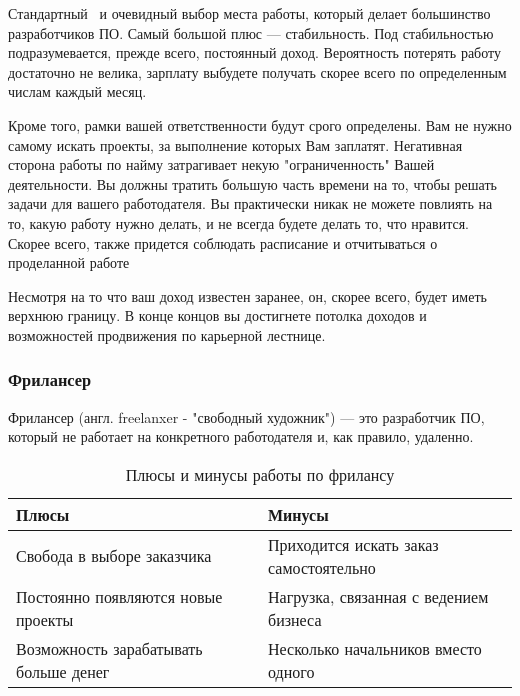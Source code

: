\documentclass{../industrial-development}
\begin{document}
\lecturenotes

Стандартный~\cite[с.~62--67]{Sonmez} и очевидный выбор места работы, который делает большинство разработчиков ПО. 
Самый большой плюс — стабильность. Под стабильностью подразумевается, прежде всего, постоянный доход. Вероятность потерять работу достаточно не велика, зарплату выбудете получать скорее всего по определенным числам каждый месяц.

Кроме того, рамки вашей ответственности будут срого определены. Вам не нужно самому искать проекты, за выполнение которых Вам заплатят. 
Негативная сторона работы по найму затрагивает некую "ограниченность" Вашей деятельности. Вы должны тратить большую часть времени на то, чтобы решать задачи для вашего работодателя. Вы практически никак не можете повлиять на то, какую работу нужно делать, и не всегда будете делать то, что нравится. Скорее всего, также придется соблюдать расписание и отчитываться о проделанной работе

Несмотря на то что ваш доход известен заранее, он, скорее всего, будет иметь верхнюю границу. В конце концов вы достигнете потолка доходов и возможностей продвижения по карьерной лестнице.


\begin{frame} \frametitle{Фрилансер}
  \begin{block}{}
    Фрилансер (англ. freelanxer - "свободный художник") --- это разработчик ПО, который не работает на конкретного работодателя и, как правило, удаленно.
  \end{block}
  
   \begin{table}[H]
\caption{\label{tab:canonsummary} Плюсы и минусы работы по фрилансу }
\begin{center}
\begin{tabular}{|p{0.5\linewidth}|p{0.5\linewidth}|}
\hline
\textbf{Плюсы} & \textbf{Минусы} \\
\hline
Свобода в выборе заказчика &  Приходится искать заказ самостоятельно \\
\hline
Постоянно появляются новые проекты  & Нагрузка, связанная с ведением бизнеса \\
\hline
Возможность зарабатывать больше денег & Несколько начальников вместо одного \\
\hline
\end{tabular}
\end{center}
\end{table} 
\end{frame}
\end{document}
